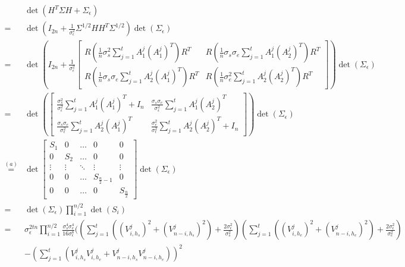 \documentclass[12pt]{article}
\begin{document}
\begin{align*}
\quad&\det \left( H^{T}\Sigma H+\Sigma_{\epsilon} \right)\\
=&\det\left( I_{2n}+\frac{1}{\sigma_{\epsilon}^2}\Sigma^{1/2}HH^T\Sigma^{1/2} \right)\det(\Sigma_{\epsilon})\\
=&\det\left( I_{2n}+\frac{1}{\sigma_{\epsilon}^2}
\begin{bmatrix}
R\left( \frac{1}{n}\sigma_{s}^2\sum_{j=1}^t A_{1}^j(A_{1}^{j})^T \right)R^T & R\left( \frac{1}{n}\sigma_{s}\sigma_{e}\sum_{j=1}^t A_{1}^j(A_{2}^{j})^T \right)R^T \\
R\left( \frac{1}{n}\sigma_{s}\sigma_{e}\sum_{j=1}^t A_{2}^j(A_{1}^{j})^T \right)R^T & R\left( \frac{1}{n}\sigma_{e}^2\sum_{j=1}^t A_{2}^j(A_{2}^{j})^T \right)R^T
\end{bmatrix}
\right)\det(\Sigma_{\epsilon})\\
=&\det \left( 
\begin{bmatrix}
\frac{\sigma_{s}^2}{\sigma_{\epsilon}^2}\sum_{j=1}^t A_{1}^j(A_{1}^{j})^T+I_{n}  & \frac{\sigma_{s}\sigma_{e}}{\sigma_{\epsilon}^2}\sum_{j=1}^t A_{1}^j(A_{2}^{j})^T  \\
 \frac{\sigma_{s}\sigma_{e}}{\sigma_{\epsilon}^2}\sum_{j=1}^t A_{2}^j(A_{1}^{j})^T  &  \frac{\sigma_{e}^2}{\sigma_{\epsilon}^2}\sum_{j=1}^t A_{2}^j(A_{2}^{j})^T+I_{n} 
\end{bmatrix}
\right)\det(\Sigma_{\epsilon})\\
\stackrel{(a)}{=}&\det
\begin{bmatrix}
S_{1} & 0 & \dots & 0 &  0 \\
0 & S_{2} & \dots & 0 & 0 \\
\vdots & \vdots & \ddots & \vdots & \vdots \\
0 & 0 & \dots & S_{\frac{n}{2}-1} & 0 \\
0 & 0 & \dots & 0 & S_{\frac{n}{2}}
\end{bmatrix}\det(\Sigma_{\epsilon})\\
=&\det(\Sigma_{\epsilon})\prod_{i=1}^{n/2}\det(S_{i})\\
=&\sigma_\epsilon^{2tn}\prod_{i=1}^{n/2}
\frac{\sigma_{s}^4\sigma_{e}^4}{16\sigma_{\epsilon}^{8}}
\Bigg( 
\left( \sum_{j=1}^t\left( (V_{i,h_{s}}^{j})^2+(V_{n-i,h_{s}}^{j})^2\right)+\frac{2\sigma^2_\epsilon}{\sigma_s^2} \right) \left( \sum_{j=1}^t\left( (V_{i,h_{e}}^{j})^2+(V_{n-i,h_{e}}^{j})^2\right)+\frac{2\sigma^2_\epsilon}{\sigma_e^2} \right) \\
\quad&-
\left( \sum_{j=1}^t\left( V_{i,h_{s}}^{j}V_{i,h_{e}}^j+V_{n-i,h_{s}}^{j}V_{n-i,h_{e}}^j\right) \right)^2 

\end{align*}
\end{document}
